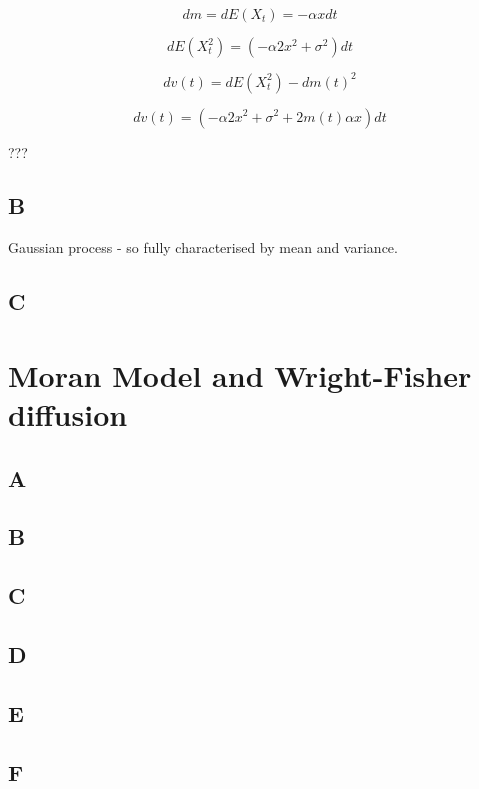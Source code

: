 \documentclass{article}
\begin{document}
$$dm = dE(X_t) = -\alpha x dt$$

$$dE(X_t^2) = (-\alpha 2 x^2 + \sigma^2) dt$$

$$dv(t) = dE(X_t^2) - dm(t)^2$$

$$dv(t) = (-\alpha 2 x^2 + \sigma^2  + 2 m(t)\alpha x) dt $$



???

\subsection{B}

Gaussian process - so fully characterised by mean and variance. 



\subsection{C}

\section{Moran Model and Wright-Fisher diffusion}

\subsection{A}

\subsection{B}

\subsection{C}

\subsection{D}

\subsection{E}

\subsection{F}
\end{document}
